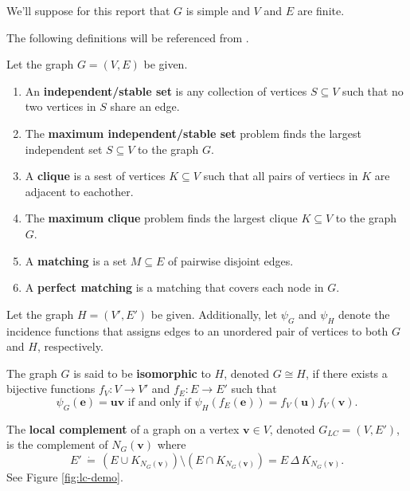 \documentclass[12pt]{report} %
\begin{document}
We'll suppose for this report that $G$ is simple and $V$ and $E$ are finite. 

\newpage 

The following definitions will be referenced from \cite{Adcock_2020, conforti2014integer, diestel2017graph, hicks2006branch}.

\begin{tcolorbox}[colback=orange!10!white, colframe=orange!75!black, title=\textbf{Definition}]
    Let the graph $G = (V,E)$ be given. 
    \begin{enumerate}[label=(\roman*), font=\itshape]
        \item An \textbf{independent/stable set} is any collection of vertices $S \subseteq V$ such that no two vertices in $S$ share an edge. 
        \item The \textbf{maximum independent/stable set} problem finds the largest independent set $S \subseteq V$ to the graph $G$.
        \item A \textbf{clique} is a sest of vertices $K \subseteq V$ such that all pairs of vertiecs in $K$ are adjacent to eachother.  
        \item The \textbf{maximum clique} problem finds the largest clique $K \subseteq V$ to the graph $G$. 
        \item A \textbf{matching} is a set $M \subseteq E$ of pairwise disjoint edges. 
        \item A \textbf{perfect matching} is a matching that covers each node in $G$. 
    \end{enumerate}
    
    Let the graph $H = (V',E')$ be given. Additionally, let $\psi_G$ and $\psi_H$ denote the incidence functions that assigns edges to an unordered pair of vertices to both $G$ and $H$, respectively. 
    
    \vspace{1em}
    
    The graph $G$ is said to be \textbf{isomorphic} to $H$, denoted $G \cong H$, if there exists a bijective functions $f_{V}: V \to V'$ and $f_{E}: E \to E'$ such that  
    \begin{equation*}
        \psi_G(\mathbf{e}) = \mathbf{u}\mathbf{v} \text{ if and only if } \psi_{H}(f_{E}(\mathbf{e})) = f_{V}(\mathbf{u})f_{V}(\mathbf{v}).
    \end{equation*}

    The \textbf{local complement} of a graph on a vertex $\mathbf{v} \in V$, denoted $G_{LC} = (V, E')$, 
    is the complement of $N_{G}(\mathbf{v})$ where  
    \begin{equation*}
        E' \, \dot{=} \, (E \cup K_{N_{G}(\mathbf{v})}) \setminus (E \cap K_{N_{G}(\mathbf{v})}) = E \, \Delta \, K_{N_{G}(\mathbf{v})}.
    \end{equation*}
    See Figure \ref{fig:lc-demo}.
\end{tcolorbox}
\end{document}
